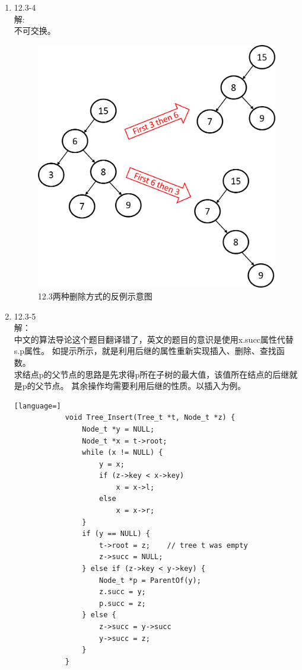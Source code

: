 \documentclass[UTF8]{ctexart}
\begin{document}
\begin{enumerate}
	\item 12.3-4 \\
	解: \\
		不可交换。\\
		\begin{figure}[H]
		\centering
        \caption{12.3两种删除方式的反例示意图}
		\includegraphics[scale=0.65]{1203_4.png}
		\end{figure}
	
	\item 12.3-5 \\
	解：\\
		中文的算法导论这个题目翻译错了，英文的题目的意识是使用x.succ属性代替s.p属性。
		如提示所示，就是利用后继的属性重新实现插入、删除、查找函数。\\
		求结点p的父节点的思路是先求得p所在子树的最大值，该值所在结点的后继就是p的父节点。
		其余操作均需要利用后继的性质。以插入为例。\\
		\begin{lstlisting}[language=]
			void Tree_Insert(Tree_t *t, Node_t *z) {
				Node_t *y = NULL;
				Node_t *x = t->root;
				while (x != NULL) {
					y = x;
					if (z->key < x->key)
						x = x->l;
					else
						x = x->r;
				}
				if (y == NULL) {
					t->root = z;	// tree t was empty
					z->succ = NULL;
				} else if (z->key < y->key) {
					Node_t *p = ParentOf(y);
					z.succ = y;
					p.succ = z;
				} else {
					z->succ = y->succ
					y->succ = z;
				}
			}
        \end{lstlisting}
		
\end{enumerate}
\end{document}
